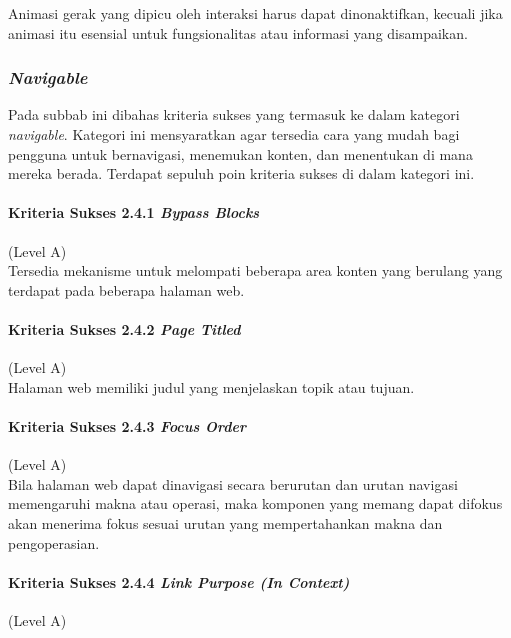 Animasi gerak yang dipicu oleh interaksi harus dapat dinonaktifkan, kecuali jika animasi itu esensial untuk fungsionalitas atau informasi yang disampaikan.

\subsubsection{\textit{Navigable}}
\label{sec:navigable}
Pada subbab ini dibahas kriteria sukses yang termasuk ke dalam kategori \textit{navigable}. Kategori ini mensyaratkan agar tersedia cara yang mudah bagi pengguna untuk bernavigasi, menemukan konten, dan menentukan di mana mereka berada. Terdapat sepuluh poin kriteria sukses di dalam kategori ini.

\paragraph{Kriteria Sukses 2.4.1 \textit{Bypass Blocks}}
\label{sec:kriteria_sukses_2.4.1}
(Level A)\\

Tersedia mekanisme untuk melompati beberapa area konten yang berulang yang terdapat pada beberapa halaman web.

\paragraph{Kriteria Sukses 2.4.2 \textit{Page Titled}}
\label{sec:kriteria_sukses_2.4.2}
(Level A)\\

Halaman web memiliki judul yang menjelaskan topik atau tujuan.

\paragraph{Kriteria Sukses 2.4.3 \textit{Focus Order}}
\label{sec:kriteria_sukses_2.4.3}
(Level A)\\

Bila halaman web dapat dinavigasi secara berurutan dan urutan navigasi memengaruhi makna atau operasi, maka komponen yang memang dapat difokus akan menerima fokus sesuai urutan yang mempertahankan makna dan pengoperasian.

\paragraph{Kriteria Sukses 2.4.4 \textit{Link Purpose (In Context)}}
\label{sec:kriteria_sukses_2.4.4}
(Level A)\\

